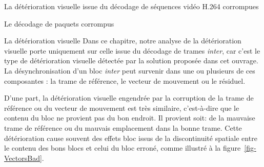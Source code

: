 \documentclass[letterpaper, twoside, 12pt,memoire]{thETS}
\newcommand{\fig}[1]{figure~\ref{#1}}
\begin{document}
\begin{chapter}{La détérioration visuelle issue du décodage de séquences vidéo
H.264 corrompues}
\begin{section}{Le décodage de paquets corrompus}
\end{section}

\begin{section}{La détérioration visuelle}
\label{sect-deterioration}
Dans ce chapitre, notre analyse de la détérioration visuelle porte uniquement
sur celle issue du décodage de trames \textit{inter}, car c'est le type de
détérioration visuelle détectée par la solution proposée dans cet ouvrage. La
désynchronisation d'un bloc \textit{inter} peut survenir dans une ou
plusieurs de ces composantes : la trame de référence, le vecteur de mouvement ou
le résiduel.

D'une part, la détérioration visuelle engendrée par la corruption de la trame de
référence ou du vecteur de mouvement est très similaire, c'est-à-dire que le
contenu du bloc ne provient pas du bon endroit. Il provient soit: de la mauvaise
trame de référence ou du mauvais emplacement dans la bonne trame. Cette
détérioration cause souvent des effets bloc issus de la discontinuité spatiale
entre le contenu des bons blocs et celui du bloc erroné, comme illustré à la
\fig{fig-VectorsBad}.

\begin{figure}[htb]
\end{figure}
\end{section}
\end{chapter}
\end{document}
